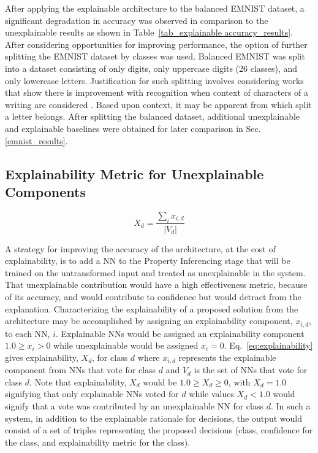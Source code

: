 \documentclass[conference]{IEEEtran}
\begin{document}
After applying the explainable architecture to the balanced EMNIST dataset, a
significant degradation in accuracy was observed in comparison to the
unexplainable results as shown in Table~\ref{tab_explainable accuracy_results}.
After considering opportunities for improving performance, the option of further
splitting the EMNIST dataset by classes was used.  Balanced EMNIST was split
into a dataset consisting of only digits, only uppercase digits (26 classes),
and only lowercase letters.  Justification for such splitting involves
considering works that show there is improvement with recognition when context
of characters of a writing are considered \cite{506792}.  Based upon context, it
may be apparent from which split a letter belongs. After splitting the balanced
dataset, additional unexplainable and explainable baselines were obtained for
later comparison in Sec. \ref{emnist_results}.

\subsection{Explainability Metric for Unexplainable Components}
\label{method:metric}

\begin{equation}
    X_d=\frac{\sum_i x_{i,d}}{|V_d|}
    \label{eq:explainability}
\end{equation}

A strategy for improving the accuracy of the architecture, at the cost of
explainability, is to add a NN to the Property Inferencing stage that will be
trained on the untransformed input and treated as unexplainable in the system.
That unexplainable contribution would have a high effectiveness metric, because
of its accuracy, and would contribute to confidence but would detract from the
explanation.  Characterizing the explainability of a proposed solution from the
architecture may be accomplished by assigning an explainability component,
$x_{i,d}$, to each NN, $i$.  Explainable NNs would be assigned an explainability
component $1.0 \geq x_i > 0$ while unexplainable would be assigned $x_i = 0$.
Eq.~\ref{eq:explainability} gives explainability, $X_d$, for class $d$ where
$x_{i,d}$ represents the explainable component from NNs that vote for class $d$
and $V_d$ is the set of NNs that vote for class $d$.  Note that explainability,
$X_d$ would be $1.0 \geq X_d \geq 0$, with $X_d = 1.0$ signifying that only
explainable NNs voted for $d$ while values $X_d < 1.0$ would signify that a vote
was contributed by an unexplainable NN for class $d$.  In such a system, in
addition to the explainable rationale for decisions, the output would consist of
a set of triples representing the proposed decisions (class, confidence for the
class, and explainability metric for the class).
\end{document}
